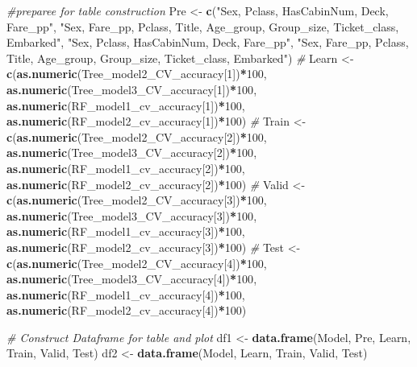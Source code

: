 \documentclass[
]{book}
\newenvironment{Shaded}{\begin{snugshade}}{\end{snugshade}}
\newcommand{\CommentTok}[1]{\textcolor[rgb]{0.56,0.35,0.01}{\textit{#1}}}
\newcommand{\DecValTok}[1]{\textcolor[rgb]{0.00,0.00,0.81}{#1}}
\newcommand{\KeywordTok}[1]{\textcolor[rgb]{0.13,0.29,0.53}{\textbf{#1}}}
\newcommand{\NormalTok}[1]{#1}
\newcommand{\OperatorTok}[1]{\textcolor[rgb]{0.81,0.36,0.00}{\textbf{#1}}}
\newcommand{\StringTok}[1]{\textcolor[rgb]{0.31,0.60,0.02}{#1}}
\begin{document}
\begin{Shaded}
\begin{Highlighting}[]
\CommentTok{#preparee for table construction}
\NormalTok{Pre <-}\StringTok{ }\KeywordTok{c}\NormalTok{(}\StringTok{"Sex, Pclass, HasCabinNum, Deck, Fare_pp"}\NormalTok{, }\StringTok{"Sex, Fare_pp, Pclass, Title, Age_group, Group_size, Ticket_class, Embarked"}\NormalTok{, }\StringTok{"Sex, Pclass, HasCabinNum, Deck, Fare_pp"}\NormalTok{, }\StringTok{"Sex, Fare_pp, Pclass, Title, Age_group, Group_size, Ticket_class, Embarked"}\NormalTok{)}
\CommentTok{#}
\NormalTok{Learn <-}\StringTok{ }\KeywordTok{c}\NormalTok{(}\KeywordTok{as.numeric}\NormalTok{(Tree_model2_CV_accuracy[}\DecValTok{1}\NormalTok{])}\OperatorTok{*}\DecValTok{100}\NormalTok{, }\KeywordTok{as.numeric}\NormalTok{(Tree_model3_CV_accuracy[}\DecValTok{1}\NormalTok{])}\OperatorTok{*}\DecValTok{100}\NormalTok{, }\KeywordTok{as.numeric}\NormalTok{(RF_model1_cv_accuracy[}\DecValTok{1}\NormalTok{])}\OperatorTok{*}\DecValTok{100}\NormalTok{, }\KeywordTok{as.numeric}\NormalTok{(RF_model2_cv_accuracy[}\DecValTok{1}\NormalTok{])}\OperatorTok{*}\DecValTok{100}\NormalTok{)}
\CommentTok{#}
\NormalTok{Train <-}\StringTok{ }\KeywordTok{c}\NormalTok{(}\KeywordTok{as.numeric}\NormalTok{(Tree_model2_CV_accuracy[}\DecValTok{2}\NormalTok{])}\OperatorTok{*}\DecValTok{100}\NormalTok{, }\KeywordTok{as.numeric}\NormalTok{(Tree_model3_CV_accuracy[}\DecValTok{2}\NormalTok{])}\OperatorTok{*}\DecValTok{100}\NormalTok{, }\KeywordTok{as.numeric}\NormalTok{(RF_model1_cv_accuracy[}\DecValTok{2}\NormalTok{])}\OperatorTok{*}\DecValTok{100}\NormalTok{, }\KeywordTok{as.numeric}\NormalTok{(RF_model2_cv_accuracy[}\DecValTok{2}\NormalTok{])}\OperatorTok{*}\DecValTok{100}\NormalTok{)}
\CommentTok{#}
\NormalTok{Valid <-}\StringTok{ }\KeywordTok{c}\NormalTok{(}\KeywordTok{as.numeric}\NormalTok{(Tree_model2_CV_accuracy[}\DecValTok{3}\NormalTok{])}\OperatorTok{*}\DecValTok{100}\NormalTok{, }\KeywordTok{as.numeric}\NormalTok{(Tree_model3_CV_accuracy[}\DecValTok{3}\NormalTok{])}\OperatorTok{*}\DecValTok{100}\NormalTok{, }\KeywordTok{as.numeric}\NormalTok{(RF_model1_cv_accuracy[}\DecValTok{3}\NormalTok{])}\OperatorTok{*}\DecValTok{100}\NormalTok{, }\KeywordTok{as.numeric}\NormalTok{(RF_model2_cv_accuracy[}\DecValTok{3}\NormalTok{])}\OperatorTok{*}\DecValTok{100}\NormalTok{)}
\CommentTok{#}
\NormalTok{Test <-}\StringTok{ }\KeywordTok{c}\NormalTok{(}\KeywordTok{as.numeric}\NormalTok{(Tree_model2_CV_accuracy[}\DecValTok{4}\NormalTok{])}\OperatorTok{*}\DecValTok{100}\NormalTok{, }\KeywordTok{as.numeric}\NormalTok{(Tree_model3_CV_accuracy[}\DecValTok{4}\NormalTok{])}\OperatorTok{*}\DecValTok{100}\NormalTok{, }\KeywordTok{as.numeric}\NormalTok{(RF_model1_cv_accuracy[}\DecValTok{4}\NormalTok{])}\OperatorTok{*}\DecValTok{100}\NormalTok{, }\KeywordTok{as.numeric}\NormalTok{(RF_model2_cv_accuracy[}\DecValTok{4}\NormalTok{])}\OperatorTok{*}\DecValTok{100}\NormalTok{)}

\CommentTok{# Construct Dataframe for table and plot}
\NormalTok{df1 <-}\StringTok{ }\KeywordTok{data.frame}\NormalTok{(Model, Pre, Learn, Train, Valid, Test)}
\NormalTok{df2 <-}\StringTok{ }\KeywordTok{data.frame}\NormalTok{(Model, Learn, Train, Valid, Test)}
\end{Highlighting}
\end{Shaded}
\end{document}
